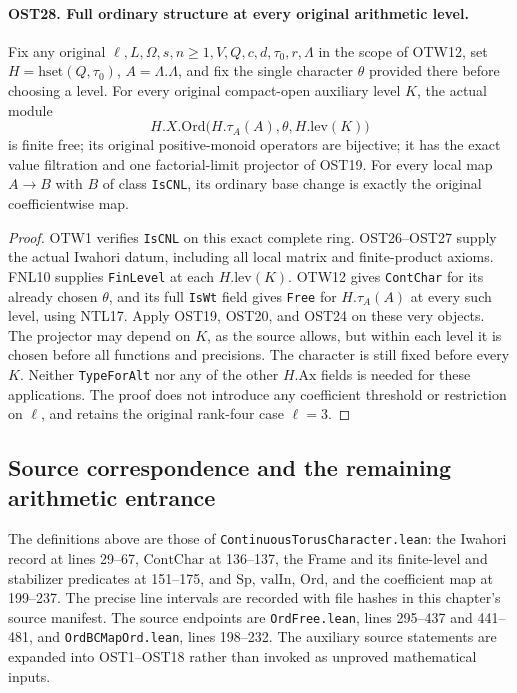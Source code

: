 \documentclass[11pt,a4paper]{article}
\numberwithin{equation}{section}
\theoremstyle{remark}\newtheorem{remark}[theorem]{Remark}
\begin{document}
\paragraph{OST28. Full ordinary structure at every original arithmetic level.}
\label{claim:OST28}
Fix any original $\ell,\allowbreak{} L,\Omega,\allowbreak{} s,\allowbreak{} n\geq1,\allowbreak{} V,\allowbreak{} Q,\allowbreak{} c,\allowbreak{} d,\tau_0,\allowbreak{} r,\Lambda$
in the scope of OTW12, set $H=\mathrm{hset}(Q,\tau_0)$,
$A=\Lambda.\Lambda$, and fix the single character $\theta$
provided there before choosing a level.  For every original
compact-open auxiliary level $K$, the actual module
\[
 H.X.\mathrm{Ord}\bigl(H.\tau_A(A),\theta,\allowbreak{} H.\mathrm{lev}(K)\bigr)
\]
is finite free; its original positive-monoid operators are
bijective; it has the exact value filtration and one
factorial-limit projector of OST19.  For every local map
$A\to B$ with $B$ of class \texttt{Is\allowbreak CNL}, its ordinary
base change is exactly the original coefficientwise map.
\begin{proof}
OTW1 verifies \texttt{Is\allowbreak CNL} on this exact complete ring.
OST26--OST27 supply the actual Iwahori datum, including all
local matrix and finite-product axioms.  FNL10 supplies
\texttt{Fin\allowbreak Level} at each $H.\mathrm{lev}(K)$.  OTW12 gives
\texttt{Cont\allowbreak Char} for its already chosen $\theta$, and its
full \texttt{Is\allowbreak Wt} field gives \texttt{Free} for
$H.\tau_A(A)$ at every such level, using NTL17.
Apply OST19, OST20, and OST24 on these very objects.
The projector may depend on $K$, as the source allows, but
within each level it is chosen before all functions and
precisions.  The character is still fixed before every $K$.
Neither \texttt{Type\allowbreak For\allowbreak Alt} nor any of the other
$H.\mathrm{Ax}$ fields is needed for these applications.
The proof does not introduce any coefficient threshold or
restriction on $\ell$, and retains the original rank-four
case $\ell=3$.
\end{proof}

\subsection{Source correspondence and the remaining arithmetic entrance}

The definitions above are those of
\texttt{Continuous\allowbreak Torus\allowbreak Character.\allowbreak lean}: the Iwahori record at
lines 29--67, $\mathrm{ContChar}$ at 136--137, the Frame and
its finite-level and stabilizer predicates at 151--175, and
$\mathrm{Sp}$, $\mathrm{valIn}$, $\mathrm{Ord}$, and the
coefficient map at 199--237.  The precise line intervals are
recorded with file hashes in this chapter's source manifest.
The source endpoints are
\texttt{Ord\allowbreak Free.\allowbreak lean}, lines 295--437 and 441--481, and
\texttt{Ord\allowbreak BCMap\allowbreak Ord.\allowbreak lean}, lines 198--232.  The auxiliary
source statements are expanded into OST1--OST18 rather than
invoked as unproved mathematical inputs.
\end{document}
